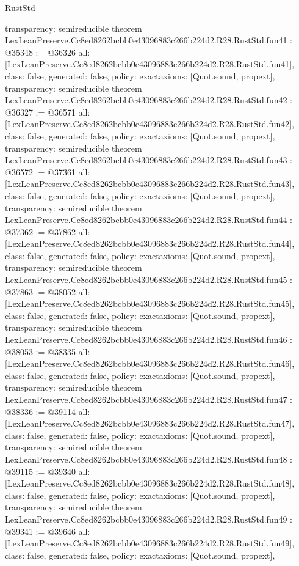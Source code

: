 \begin{lexlean}{RustStd}
\begin{coremodule}
{  transparency: semireducible
}
theorem LexLeanPreserve.Cc8ed8262bcbb0e43096883c266b224d2.R28.RustStd.fun41 : @35348 := @36326 {
  all: [LexLeanPreserve.Cc8ed8262bcbb0e43096883c266b224d2.R28.RustStd.fun41],
  class: false,
  generated: false,
  policy: exact{axioms: [Quot.sound, propext]},
  transparency: semireducible
}
theorem LexLeanPreserve.Cc8ed8262bcbb0e43096883c266b224d2.R28.RustStd.fun42 : @36327 := @36571 {
  all: [LexLeanPreserve.Cc8ed8262bcbb0e43096883c266b224d2.R28.RustStd.fun42],
  class: false,
  generated: false,
  policy: exact{axioms: [Quot.sound, propext]},
  transparency: semireducible
}
theorem LexLeanPreserve.Cc8ed8262bcbb0e43096883c266b224d2.R28.RustStd.fun43 : @36572 := @37361 {
  all: [LexLeanPreserve.Cc8ed8262bcbb0e43096883c266b224d2.R28.RustStd.fun43],
  class: false,
  generated: false,
  policy: exact{axioms: [Quot.sound, propext]},
  transparency: semireducible
}
theorem LexLeanPreserve.Cc8ed8262bcbb0e43096883c266b224d2.R28.RustStd.fun44 : @37362 := @37862 {
  all: [LexLeanPreserve.Cc8ed8262bcbb0e43096883c266b224d2.R28.RustStd.fun44],
  class: false,
  generated: false,
  policy: exact{axioms: [Quot.sound, propext]},
  transparency: semireducible
}
theorem LexLeanPreserve.Cc8ed8262bcbb0e43096883c266b224d2.R28.RustStd.fun45 : @37863 := @38052 {
  all: [LexLeanPreserve.Cc8ed8262bcbb0e43096883c266b224d2.R28.RustStd.fun45],
  class: false,
  generated: false,
  policy: exact{axioms: [Quot.sound, propext]},
  transparency: semireducible
}
theorem LexLeanPreserve.Cc8ed8262bcbb0e43096883c266b224d2.R28.RustStd.fun46 : @38053 := @38335 {
  all: [LexLeanPreserve.Cc8ed8262bcbb0e43096883c266b224d2.R28.RustStd.fun46],
  class: false,
  generated: false,
  policy: exact{axioms: [Quot.sound, propext]},
  transparency: semireducible
}
theorem LexLeanPreserve.Cc8ed8262bcbb0e43096883c266b224d2.R28.RustStd.fun47 : @38336 := @39114 {
  all: [LexLeanPreserve.Cc8ed8262bcbb0e43096883c266b224d2.R28.RustStd.fun47],
  class: false,
  generated: false,
  policy: exact{axioms: [Quot.sound, propext]},
  transparency: semireducible
}
theorem LexLeanPreserve.Cc8ed8262bcbb0e43096883c266b224d2.R28.RustStd.fun48 : @39115 := @39340 {
  all: [LexLeanPreserve.Cc8ed8262bcbb0e43096883c266b224d2.R28.RustStd.fun48],
  class: false,
  generated: false,
  policy: exact{axioms: [Quot.sound, propext]},
  transparency: semireducible
}
theorem LexLeanPreserve.Cc8ed8262bcbb0e43096883c266b224d2.R28.RustStd.fun49 : @39341 := @39646 {
  all: [LexLeanPreserve.Cc8ed8262bcbb0e43096883c266b224d2.R28.RustStd.fun49],
  class: false,
  generated: false,
  policy: exact{axioms: [Quot.sound, propext]},
}
\end{coremodule}
\end{lexlean}
